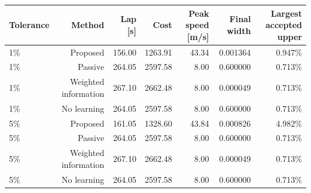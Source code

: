 \begin{tabular}{lrrrrrr}
\toprule
Tolerance & Method & Lap [s] & Cost & Peak speed [m/s] & Final width & Largest accepted upper \\
\midrule
1\% & Proposed & 156.00 & 1263.91 & 43.34 & 0.001364 & 0.947\% \\
1\% & Passive & 264.05 & 2597.58 & 8.00 & 0.600000 & 0.713\% \\
1\% & Weighted information & 267.10 & 2662.48 & 8.00 & 0.000049 & 0.713\% \\
1\% & No learning & 264.05 & 2597.58 & 8.00 & 0.600000 & 0.713\% \\
5\% & Proposed & 161.05 & 1328.60 & 43.84 & 0.000826 & 4.982\% \\
5\% & Passive & 264.05 & 2597.58 & 8.00 & 0.600000 & 0.713\% \\
5\% & Weighted information & 267.10 & 2662.48 & 8.00 & 0.000049 & 0.713\% \\
5\% & No learning & 264.05 & 2597.58 & 8.00 & 0.600000 & 0.713\% \\
\bottomrule
\end{tabular}
